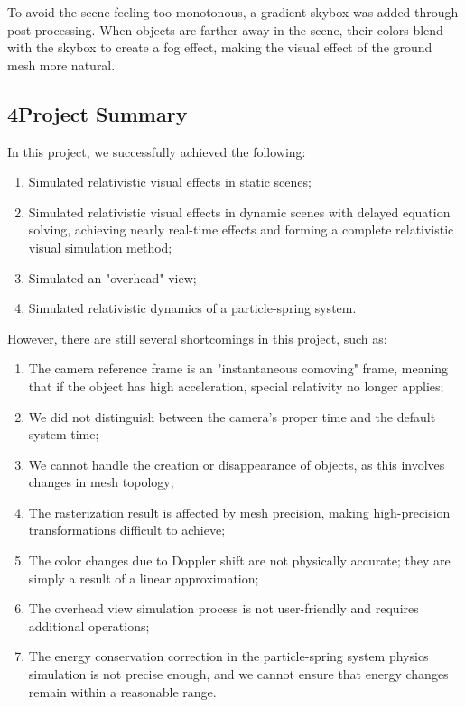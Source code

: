 \documentclass{article}
\begin{document}
To avoid the scene feeling too monotonous, a gradient skybox was added through post-processing. When objects are farther away in the scene, their colors blend with the skybox to create a fog effect, making the visual effect of the ground mesh more natural.

\subsection*{4\quad Project Summary}

In this project, we successfully achieved the following:
\begin{enumerate}[(1)]
    \item Simulated relativistic visual effects in static scenes;
    \item Simulated relativistic visual effects in dynamic scenes with delayed equation solving, achieving nearly real-time effects and forming a complete relativistic visual simulation method;
    \item Simulated an "overhead" view;
    \item Simulated relativistic dynamics of a particle-spring system.
\end{enumerate}

However, there are still several shortcomings in this project, such as:
\begin{enumerate}[(1)]
    \item The camera reference frame is an "instantaneous comoving" frame, meaning that if the object has high acceleration, special relativity no longer applies;
    \item We did not distinguish between the camera's proper time and the default system time;
    \item We cannot handle the creation or disappearance of objects, as this involves changes in mesh topology;
    \item The rasterization result is affected by mesh precision, making high-precision transformations difficult to achieve;
    \item The color changes due to Doppler shift are not physically accurate; they are simply a result of a linear approximation;
    \item The overhead view simulation process is not user-friendly and requires additional operations;
    \item The energy conservation correction in the particle-spring system physics simulation is not precise enough, and we cannot ensure that energy changes remain within a reasonable range.
\end{enumerate}
\end{document}
